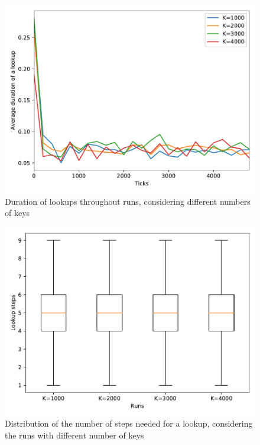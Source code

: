 \documentclass[11pt,twocolumn,letterpaper]{article}
\begin{document}
	\begin{figure}[t]
		\centering
		\includegraphics[width=\linewidth,clip,trim=0 0.5cm 0 0.35cm]{figures/analysis3/lookupduration_time.pdf}
		\caption{Duration of lookups throughout runs, considering different numbers of keys}
		\label{fig:keys0}
	\end{figure}
	\begin{figure}[!h]
		\centering
		\includegraphics[width=\linewidth,clip,trim=0 0.5cm 0 0.35cm]{figures/analysis3/lookuplength_box.pdf}
		\caption{Distribution of the number of steps needed for a lookup, considering the runs with different number of keys}
		\label{fig:keys1}
	\end{figure}
	
\end{document}
